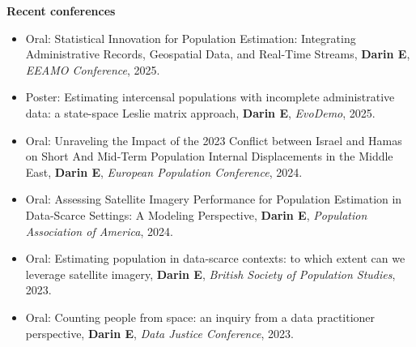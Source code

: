 \documentclass[
]{friggeri-cv}
\begin{document}
\begin{noside}
\textbf{Recent conferences}
\begin{itemize}
\item Oral: Statistical Innovation for Population Estimation: Integrating Administrative Records, Geospatial Data, and Real-Time Streams, \textbf{Darin E}, \textit{EEAMO Conference}, 2025.
\item Poster: Estimating intercensal populations with incomplete administrative data: a state-space Leslie matrix approach, \textbf{Darin E}, \textit{EvoDemo}, 2025.
 \item Oral: Unraveling the Impact of the 2023 Conflict between Israel and Hamas on Short And Mid-Term Population Internal Displacements in the Middle East, \textbf{Darin E}, \textit{European Population Conference}, 2024. 
 \item Oral: Assessing Satellite Imagery Performance for Population Estimation in Data-Scarce Settings: A Modeling Perspective, \textbf{Darin E}, \textit{Population Association of America}, 2024. 
 \item Oral: Estimating population in data-scarce contexts: to which extent can we leverage satellite imagery, \textbf{Darin E}, \textit{British Society of Population Studies}, 2023. 
 \item Oral: Counting people from space: an inquiry from a data practitioner perspective, \textbf{Darin E}, \textit{Data Justice Conference}, 2023. 
\end{itemize}


\end{noside}
\end{document}
